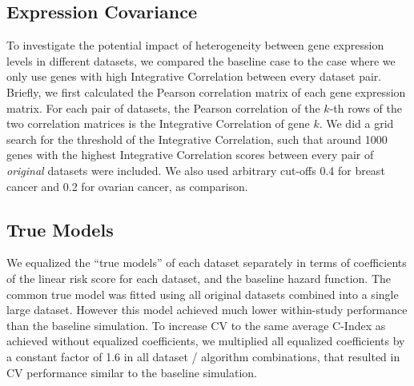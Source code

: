 \documentclass{bioinfo}
\begin{document}
  \subsection{Expression Covariance}
  To investigate the potential impact of heterogeneity between gene
  expression levels in different datasets, we compared the baseline
  case to the case where we only use genes with
  high Integrative Correlation \citep{Parmigiani2004, Garrett-Mayer2008}
  between every dataset pair. Briefly, we first calculated the Pearson
  correlation matrix of each gene expression matrix. For each pair of
  datasets, the Pearson correlation of the $k$-th rows of the two
  correlation matrices is the Integrative Correlation of gene $k$. 
  We did a grid search for the threshold of the Integrative Correlation,
  such that around 1000 genes with
  the highest Integrative Correlation scores between every pair
  of \emph{original} datasets were included. We also used arbitrary cut-offs 0.4 for 
  breast cancer and 0.2 for ovarian cancer, as comparison.

  \subsection{True Models}
  We equalized the ``true models'' of each dataset separately in terms
  of coefficients of the linear risk score for each dataset, and
  the baseline hazard function.  The common true model was fitted using
  all original datasets combined into a single large dataset.  However
  this model achieved much lower within-study performance than the
  baseline simulation. To increase CV to the same average C-Index as achieved without
  equalized coefficients, we multiplied all equalized coefficients
  by a constant factor of 1.6 in all dataset / algorithm combinations, that resulted 
  in CV performance similar
  to the baseline simulation.%


  
\end{document}
